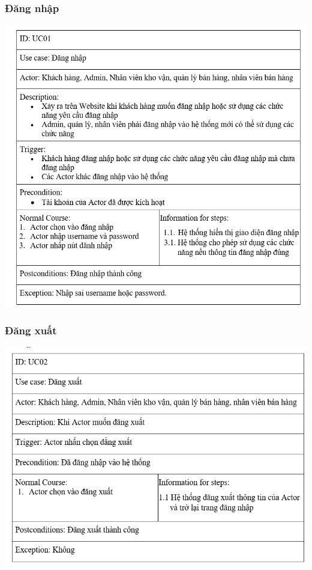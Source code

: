 \documentclass[12pt,a4paper,2sides]{report}
\begin{document}
\subsubsection{Đăng nhập}
    \includegraphics[width=1\linewidth]{lib/usecase/dangnhap.png}\\\vspace*{1cm}
\subsubsection{Đăng xuất}
    \includegraphics[width=1\linewidth]{lib/usecase/dangxuat.png}\\\vspace*{1cm}
\end{document}
